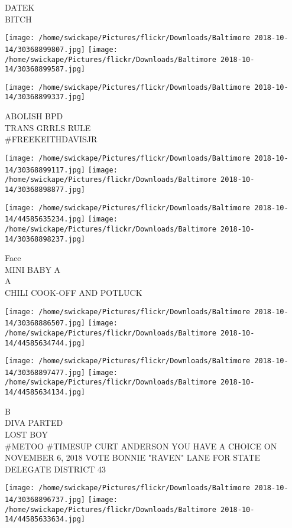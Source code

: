 \documentclass[10pt,letterpaper]{article}
\begin{document}
DATEK\\
BITCH\\
\pagebreak

\texttt{[image: /home/swickape/Pictures/flickr/Downloads/Baltimore 2018-10-14/30368899807.jpg]}
\texttt{[image: /home/swickape/Pictures/flickr/Downloads/Baltimore 2018-10-14/30368899587.jpg]}

\vspace{0.25in}
\texttt{[image: /home/swickape/Pictures/flickr/Downloads/Baltimore 2018-10-14/30368899337.jpg]}

ABOLISH BPD\\
TRANS GRRLS RULE\\
\#FREEKEITHDAVISJR\\
\pagebreak

\texttt{[image: /home/swickape/Pictures/flickr/Downloads/Baltimore 2018-10-14/30368899117.jpg]}
\texttt{[image: /home/swickape/Pictures/flickr/Downloads/Baltimore 2018-10-14/30368898877.jpg]}

\texttt{[image: /home/swickape/Pictures/flickr/Downloads/Baltimore 2018-10-14/44585635234.jpg]}
\texttt{[image: /home/swickape/Pictures/flickr/Downloads/Baltimore 2018-10-14/30368898237.jpg]}

Face\\
MINI BABY A\\
A\\
CHILI COOK{-}OFF AND POTLUCK\\
\pagebreak

\texttt{[image: /home/swickape/Pictures/flickr/Downloads/Baltimore 2018-10-14/30368886507.jpg]}
\texttt{[image: /home/swickape/Pictures/flickr/Downloads/Baltimore 2018-10-14/44585634744.jpg]}

\texttt{[image: /home/swickape/Pictures/flickr/Downloads/Baltimore 2018-10-14/30368897477.jpg]}
\texttt{[image: /home/swickape/Pictures/flickr/Downloads/Baltimore 2018-10-14/44585634134.jpg]}

B\\
DIVA PARTED\\
LOST BOY\\
\#METOO \#TIMESUP CURT ANDERSON YOU HAVE A CHOICE ON NOVEMBER 6, 2018 VOTE BONNIE "RAVEN" LANE FOR STATE DELEGATE DISTRICT 43\\
\pagebreak

\texttt{[image: /home/swickape/Pictures/flickr/Downloads/Baltimore 2018-10-14/30368896737.jpg]}
\texttt{[image: /home/swickape/Pictures/flickr/Downloads/Baltimore 2018-10-14/44585633634.jpg]}
\end{document}
